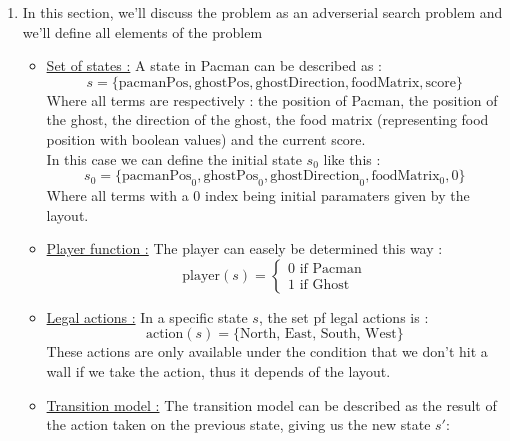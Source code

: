 \documentclass{article}
\begin{document}
\begin{enumerate}[label=\alph*.,leftmargin=*]
    \item In this section, we'll discuss the problem as an adverserial search problem and we'll define all elements of the problem
    \begin{itemize}
        \item \underline{Set of states :} A state in Pacman can be described as :
        \begin{equation*}
            s = \{\text{pacmanPos}, \text{ghostPos}, \text{ghostDirection}, \text{foodMatrix}, \text{score}\}
        \end{equation*}
        Where all terms are respectively : the position of Pacman, the position of the ghost, the direction of the ghost, the food matrix (representing food position with boolean values) and the current score.
        \\
        In this case we can define the initial state $s_0$ like this :
        \begin{equation}
            s_0 = \{\text{pacmanPos}_0, \text{ghostPos}_0, \text{ghostDirection}_0, \text{foodMatrix}_0, 0\}
        \end{equation}
        Where all terms with a $0$ index being initial paramaters given by the layout.
        \item \underline{Player function :} The player can easely be determined this way :
        \begin{equation*}
            \text{player}(s) =  \begin{cases}
                                    0 \text{ if Pacman}\\
                                    1 \text{ if Ghost}
                                \end{cases}
        \end{equation*}                       
        \item \underline{Legal actions :} In a specific state $s$, the set pf legal actions is :
        \begin{equation*}
            \text{action}(s) = \{\text{North, East, South, West}\}
        \end{equation*}
        These actions are only available under the condition that we don't hit a wall if we take the action, thus it depends of the layout.
        \item \underline{Transition model :} The transition model can be described as the result of the action taken on the previous state, giving us the new state $s'$:

\end{itemize}
\end{enumerate}
\end{document}
